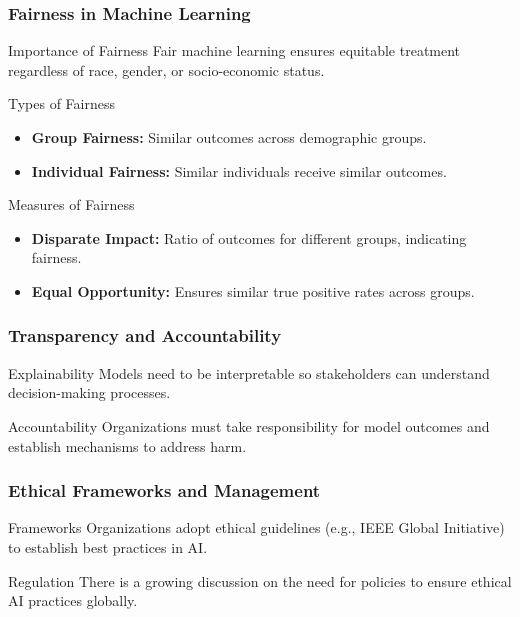 \documentclass[aspectratio=169]{beamer}
\begin{document}
\begin{frame}[fragile]
    \frametitle{Fairness in Machine Learning}
    \begin{block}{Importance of Fairness}
        Fair machine learning ensures equitable treatment regardless of race, gender, or socio-economic status.
    \end{block}

    \begin{block}{Types of Fairness}
        \begin{itemize}
            \item \textbf{Group Fairness:} Similar outcomes across demographic groups.
            \item \textbf{Individual Fairness:} Similar individuals receive similar outcomes.
        \end{itemize}
    \end{block}

    \begin{block}{Measures of Fairness}
        \begin{itemize}
            \item \textbf{Disparate Impact:} Ratio of outcomes for different groups, indicating fairness.
            \item \textbf{Equal Opportunity:} Ensures similar true positive rates across groups.
        \end{itemize}
    \end{block}
\end{frame}

\begin{frame}[fragile]
    \frametitle{Transparency and Accountability}
    \begin{block}{Explainability}
        Models need to be interpretable so stakeholders can understand decision-making processes.
    \end{block}

    \begin{block}{Accountability}
        Organizations must take responsibility for model outcomes and establish mechanisms to address harm.
    \end{block}
\end{frame}

\begin{frame}[fragile]
    \frametitle{Ethical Frameworks and Management}
    \begin{block}{Frameworks}
        Organizations adopt ethical guidelines (e.g., IEEE Global Initiative) to establish best practices in AI.
    \end{block}

    \begin{block}{Regulation}
        There is a growing discussion on the need for policies to ensure ethical AI practices globally.
    \end{block}
\end{frame}
\end{document}
